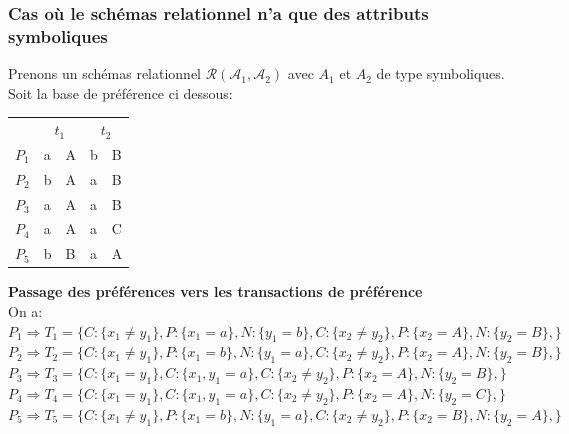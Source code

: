 \documentclass[a4paper,12pt,openany,oneside]{article}
\begin{document}
   \subsubsection{ Cas où le schémas relationnel  n'a que des attributs symboliques}
      Prenons un schémas relationnel $\mathcal{R}(\mathcal{A}_{1},\mathcal{A}_{2})$ avec $A_{1}$ et $A_{2}$ de type symboliques. Soit la base de préférence ci dessous:
      \begin{center}
      \begin{tabular}{l|l|l|l|l| } 
      
       &\multicolumn{2}{c|}{$t_{1}$} & \multicolumn{2}{c|}{$t_{2}$}\\
      \cline{2-5}
   		$P_{1}$ & a & A & b & B\\
   		$P_{2}$ & b & A & a & B\\
   		$P_{3}$ & a & A & a & B\\
   		$P_{4}$ & a & A & a & C\\
   		$P_{5}$ & b & B & a & A\\
   	\cline{2-5}
      \end{tabular}
      \end{center}   
      
        \textbf{Passage des préférences vers les transactions de préférence}\\
        On a:\\
   
        
        \noindent $P_{1}\Rightarrow T_{1}=\{C:\{x_{1}\neq y_{1}\},P:\{x_{1}=a\},N:\{y_{1}=b\},C:\{x_{2}\neq y_{2}\},P:\{x_{2}=A\},N:\{y_{2}=B\},\}$ \\
        
        \noindent $P_{2}\Rightarrow T_{2}=\{C:\{x_{1}\neq y_{1}\},P:\{x_{1}=b\},N:\{y_{1}=a\},C:\{x_{2}\neq y_{2}\},P:\{x_{2}=A\},N:\{y_{2}=B\},\}$ \\
        
        \noindent $P_{3}\Rightarrow T_{3}=\{C:\{x_{1}=y_{1}\},C:\{x_{1},y_{1}=a\},C:\{x_{2}\neq y_{2}\},P:\{x_{2}=A\},N:\{y_{2}=B\},\}$ \\
        
        \noindent $P_{4}\Rightarrow T_{4}=\{C:\{x_{1}=y_{1}\},C:\{x_{1},y_{1}=a\},C:\{x_{2}\neq y_{2}\},P:\{x_{2}=A\},N:\{y_{2}=C\},\}$ \\
        
        \noindent $P_{5}\Rightarrow T_{5}=\{C:\{x_{1}\neq y_{1}\},P:\{x_{1}=b\},N:\{y_{1}=a\},C:\{x_{2}\neq y_{2}\},P:\{x_{2}=B\},N:\{y_{2}=A\},\}$ \\
        
\end{document}
